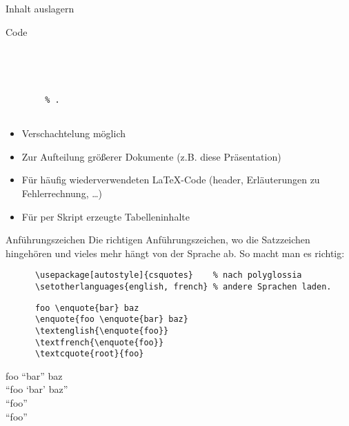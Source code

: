 \begin{frame}[fragile]{Inhalt auslagern}
  \begin{block}{Code}
    \begin{lstlisting}
      
      
        
        
        % .
      
    \end{lstlisting}
  \end{block}
  \begin{itemize}
    \item Verschachtelung möglich
    \item Zur Aufteilung größerer Dokumente (z.B. diese Präsentation)
    \item Für häufig wiederverwendeten \LaTeX-Code (header, Erläuterungen zu Fehlerrechnung, …)
    \item Für per Skript erzeugte Tabelleninhalte
  \end{itemize}
\end{frame}

\begin{frame}[fragile]{Anführungszeichen}
  Die richtigen Anführungszeichen, wo die Satzzeichen hingehören und vieles mehr hängt von der Sprache ab.
  So macht man es richtig:
  \begin{Packages}
    \begin{lstlisting}
      \usepackage[autostyle]{csquotes}    % nach polyglossia
      \setotherlanguages{english, french} % andere Sprachen laden.
    \end{lstlisting}
  \end{Packages}
  \begin{CodeExample}{0.60}
    \begin{lstlisting}
      foo \enquote{bar} baz
      \enquote{foo \enquote{bar} baz}
      \textenglish{\enquote{foo}}
      \textfrench{\enquote{foo}}
      \textcquote{root}{foo}
    \end{lstlisting}
  \CodeResult
    foo \enquote{bar} baz \\
    \enquote{foo \enquote{bar} baz} \\
    \textenglish{\enquote{foo}} \\
    \textfrench{ \enquote{foo}} \\
  \end{CodeExample}
\end{frame}
